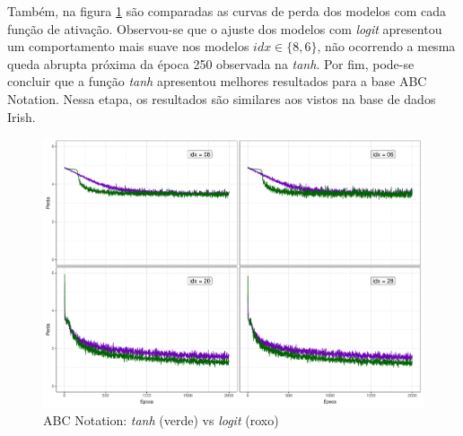 \documentclass[twoside]{automatextcc}
\begin{document}
Também, na figura \ref{fig:abcnotation_tanh_vs_logit} são comparadas as curvas de perda dos modelos com cada função de ativação. Observou-se que o ajuste dos modelos com \textit{logit} apresentou um comportamento mais suave nos modelos $idx \in \{8,6\}$, não ocorrendo a mesma queda abrupta próxima da época 250 observada na \textit{tanh}. Por fim, pode-se concluir que a função \textit{tanh} apresentou melhores resultados para a base ABC Notation. Nessa etapa, os resultados são similares aos vistos na base de dados Irish. 

\begin{figure}
    \centering
    \includegraphics[width=\textwidth]{abcnotation_tanh_vs_logit.pdf}
    \caption{ABC Notation: \textit{tanh} (verde) vs \textit{logit} (roxo)}
    \label{fig:abcnotation_tanh_vs_logit}
\end{figure}



\end{document}
